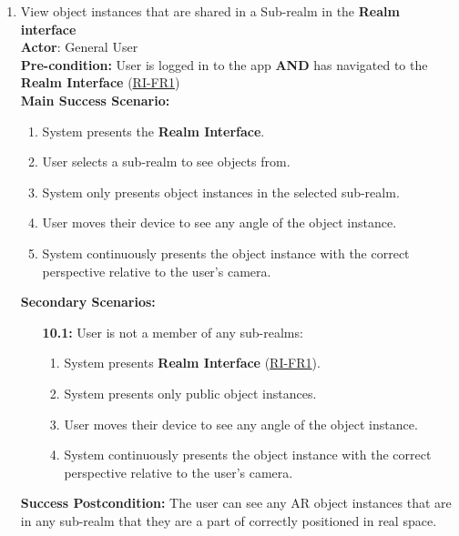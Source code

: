 \documentclass{article}
\begin{document}
\begin{enumerate}[label=\textbf{UC\arabic*}]
    \item \label{uc:10} View object instances that are shared in a Sub-realm in the \textbf{Realm interface} \\
          \textbf{Actor}: General User \\
          \textbf{Pre-condition:} User is logged in to the app \textbf{AND} has navigated to the \textbf{Realm Interface} (\hyperref[ssub:realm_interface]{RI-FR1}) \\

          \textbf{Main Success Scenario:}
          \begin{enumerate}[label=\textbf{\arabic*.}]
              \item System presents the \textbf{Realm Interface}.
              \item User selects a sub-realm to see objects from.
              \item System only presents object instances in the selected sub-realm.
              \item User moves their device to see any angle of the object instance.
              \item System continuously presents the object instance with the correct perspective relative to the user’s camera.
          \end{enumerate}

          \textbf{Secondary Scenarios:}
          \begin{itemize}
              \item[{\bf 10.1:}] User is not a member of any sub-realms:
                  \begin{enumerate}[label=\textbf{\arabic*.}]
                      \item System presents \textbf{Realm Interface} (\hyperref[ssub:realm_interface]{RI-FR1}).
                      \item System presents only public object instances.
                      \item User moves their device to see any angle of the object instance.
                      \item System continuously presents the object instance with the correct perspective relative to the user’s camera.
                  \end{enumerate}
          \end{itemize}

          \textbf{Success Postcondition:} The user can see any AR object instances that are in any sub-realm that they are a part of correctly positioned in real space.


\end{enumerate}
\end{document}
